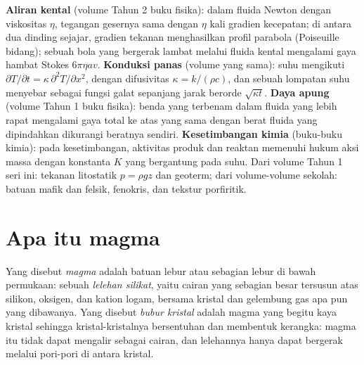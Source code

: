 \begin{recall}
\textbf{Aliran kental} (volume Tahun 2 buku fisika): dalam fluida Newton dengan
viskositas $\eta$, tegangan gesernya sama dengan $\eta$ kali gradien kecepatan; di antara
dua dinding sejajar, gradien tekanan menghasilkan profil parabola (Poiseuille
bidang); sebuah bola yang bergerak lambat melalui fluida kental mengalami gaya hambat Stokes
$6\pi\eta a v$. \textbf{Konduksi panas} (volume yang sama): suhu mengikuti
$\partial T/\partial t = \kappa\,\partial^2T/\partial x^2$, dengan difusivitas $\kappa = k/(\rho
c)$, dan sebuah lompatan suhu menyebar sebagai fungsi galat sepanjang jarak berorde
$\sqrt{\kappa t}$. \textbf{Daya apung} (volume Tahun 1 buku fisika): benda
yang terbenam dalam fluida yang lebih rapat mengalami gaya total ke atas yang sama dengan berat fluida
yang dipindahkan dikurangi beratnya sendiri. \textbf{Kesetimbangan kimia} (buku-buku kimia): pada
kesetimbangan, aktivitas produk dan reaktan memenuhi hukum aksi
massa dengan konstanta $K$ yang bergantung pada suhu. Dari volume Tahun 1
seri ini: tekanan litostatik $p = \rho g z$ dan geoterm; dari
volume-volume sekolah: batuan mafik dan felsik, fenokris, dan tekstur porfiritik.
\end{recall}

\section{Apa itu magma}

\begin{definition}[Magma]\label{def:b2:magma-emplacement:magma}
Yang disebut \emph{magma} adalah batuan lebur atau sebagian lebur di bawah permukaan: sebuah
\emph{lelehan silikat}, yaitu cairan yang sebagian besar tersusun atas silikon,
oksigen, dan kation logam, bersama kristal dan gelembung gas apa pun yang dibawanya.
Yang disebut \emph{bubur kristal} adalah magma yang begitu kaya kristal sehingga kristal-kristalnya
bersentuhan dan membentuk kerangka: magma itu tidak dapat mengalir sebagai cairan, dan lelehannya hanya dapat
bergerak melalui pori-pori di antara kristal.
\end{definition}

